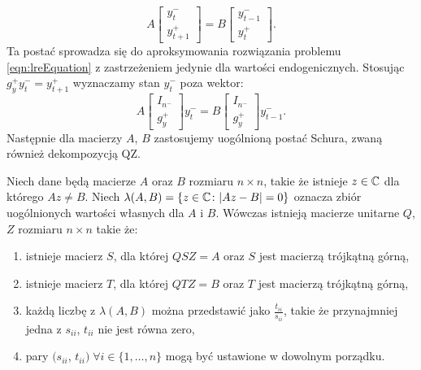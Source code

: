 \begin{equation}
    A
    \begin{bmatrix}
        y_t^- \\
        y_{t+1}^+
    \end{bmatrix} = 
    B
    \begin{bmatrix}
        y_{t-1}^- \\
        y_{t}^+
    \end{bmatrix}.
\end{equation}
Ta postać sprowadza się do aproksymowania rozwiązania problemu \eqref{eqn:lreEquation} z zastrzeżeniem jedynie dla wartości endogenicznych. Stosując $g_y^+ y_t^- = y^+_{t+1}$ wyznaczamy stan $y_t^-$ poza wektor:
\begin{equation}
    A
    \begin{bmatrix}
        I_{n^-} \\
        g_y^+
    \end{bmatrix}  y_t^- = 
    B
    \begin{bmatrix}
        I_{n^-} \\
        g_y^+
    \end{bmatrix} y^-_{t-1}.
\end{equation}
Następnie dla macierzy $A$, $B$ zastosujemy uogólnioną postać Schura, zwaną również dekompozycją QZ.

\begin{theorem}
\label{theorem:schur}

Niech dane będą macierze $A$ oraz $B$ rozmiaru $n \times n$, takie że istnieje $z \in \mathbb{C}$ dla którego $A z \neq B$. Niech $\lambda(A, B) = \left\{z \in \mathbb{C} \colon |A z - B| = 0\right\}$ oznacza zbiór uogólnionych wartości własnych dla $A$ i $B$. Wówczas istnieją macierze unitarne $Q$, $Z$ rozmiaru $n \times n$ takie że:
\begin{enumerate}
    \item istnieje macierz $S$, dla której $QSZ = A$ oraz $S$ jest macierzą trójkątną górną,
    \item istnieje macierz $T$, dla której $QTZ = B$ oraz $T$ jest macierzą trójkątną górną,
    \item każdą liczbę z $\lambda(A, B)$ można przedstawić jako $\frac{t_{ii}}{s_{ii}}$, takie że przynajmniej jedna z $s_{ii}$, $t_{ii}$ nie jest równa zero,
    \item pary $(s_{ii}$, $t_{ii})\;\forall i \in \{1,\dots, n\}$ mogą być ustawione w dowolnym porządku.
\end{enumerate}
\end{theorem}

